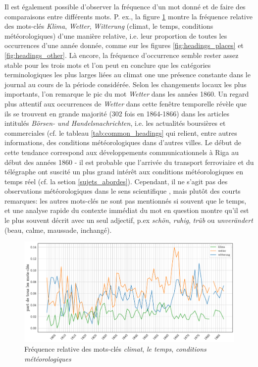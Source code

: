 \documentclass[a4paper,twoside,12pt]{article}
\begin{document}
Il est également possible d'observer la fréquence d'un mot donné et de faire des comparaisons entre différents mots. P. ex., la figure \ref{fig:wetter_witterung_klima} montre la fréquence relative des mots-clés \textit{Klima}, \textit{Wetter}, \textit{Witterung} (climat, le temps, conditions météorologiques) d'une manière relative, i.e. leur proportion de toutes les occurrences d'une année donnée, comme sur les figures \ref{fig:headings_places} et \ref{fig:headings_other}. Là encore, la fréquence d'occurrence semble rester assez stable pour les trois mots et l'on peut en conclure que les catégories terminologiques les plus larges liées au climat one une présence constante dans le journal au cours de la période considérée. Selon les changements locaux les plus importants, l'on remarque le pic du mot \textit{Wetter} dans les années 1860. Un regard plus attentif aux occurrences de \textit{Wetter} dans cette fenêtre temporelle révèle que ils se trouvent en grande majorité (302 fois en 1864-1866) dans les articles intitulés \textit{Börsen- und Handelsnachrichten}, i.e. les actualités boursières et commerciales (cf. le tableau \ref{tab:common_headings} qui relient, entre autres informations, des conditions météorologiques dans d'autres villes. Le début de cette tendance correspond aux développements communicationnels à Riga au début des années 1860 - il est probable que l'arrivée du transport ferroviaire et du télégraphe ont suscité un plus grand intérêt aux conditions météorologiques en temps réel (cf. la setion \ref{sujets_abordes}). Cependant, il ne s'agit pas des observations météorologiques dans le sens \og scientifique \fg{}, mais plutôt des courts remarques: les autres mots-clés ne sont pas mentionnés si souvent que le temps, et une analyse rapide du contexte immédiat du mot en question montre qu'il est le plus souvent décrit avec un seul adjectif, p.ex \textit{schön}, \textit{ruhig}, \textit{trüb} ou \textit{unverändert} (beau, calme, maussade, inchangé).


\begin{figure}[h]
    \centering
    \includegraphics[width=\textwidth]{images/wetter_witterung_klima.pdf}
    \caption{Fréquence relative des mots-clés \textit{climat}, \textit{le temps}, \textit{conditions météorologiques}}
    \label{fig:wetter_witterung_klima}
\end{figure}
\end{document}
